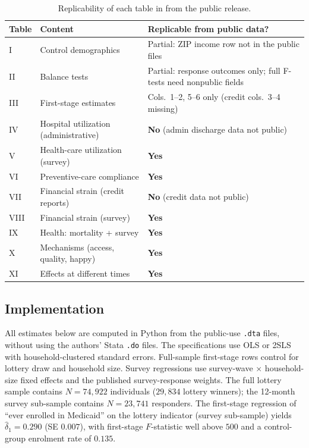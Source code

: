 \documentclass[11pt]{article}
\begin{document}
\begin{table}[H]\centering\footnotesize
\caption{Replicability of each table in \citet{Finkelstein2012} from
the public release.}
\label{tab:replicability}
\begin{tabular}{llp{}}
\toprule
Table & Content & Replicable from public data? \\
\midrule
I    & Control demographics                  & Partial: ZIP income row not in the public files \\
II   & Balance tests                         & Partial: response outcomes only; full F-tests need nonpublic fields \\
III  & First-stage estimates                 & Cols.\ 1--2, 5--6 only (credit cols.\ 3--4 missing) \\
IV   & Hospital utilization (administrative) & \textbf{No} (admin discharge data not public) \\
V    & Health-care utilization (survey)      & \textbf{Yes} \\
VI   & Preventive-care compliance            & \textbf{Yes} \\
VII  & Financial strain (credit reports)     & \textbf{No} (credit data not public) \\
VIII & Financial strain (survey)             & \textbf{Yes} \\
IX   & Health: mortality + survey            & \textbf{Yes} \\
X    & Mechanisms (access, quality, happy)   & \textbf{Yes} \\
XI   & Effects at different times            & \textbf{Yes} \\
\bottomrule
\end{tabular}
\end{table}

\subsection{Implementation}

All estimates below are computed in Python from the public-use
\texttt{.dta} files, without using the authors' Stata \texttt{.do}
files. The specifications use OLS or 2SLS with household-clustered
standard errors. Full-sample first-stage rows control for lottery draw
and household size. Survey regressions use survey-wave $\times$
household-size fixed effects and the published survey-response weights.
The full lottery sample contains $N=74{,}922$ individuals ($29{,}834$
lottery winners); the 12-month survey sub-sample contains $N=23{,}741$
responders. The
first-stage regression of ``ever enrolled in Medicaid'' on the lottery
indicator (survey sub-sample) yields $\hat{\delta}_{1}=0.290$ (SE
$0.007$), with first-stage $F$-statistic well above $500$ and a
control-group enrolment rate of $0.135$.
\end{document}

